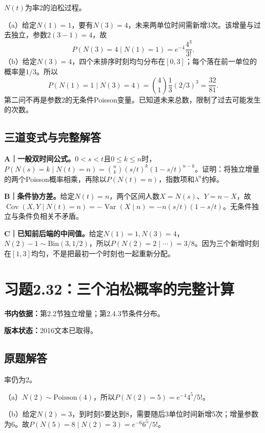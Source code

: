 \documentclass[
  11pt,
  a4paper,
  UTF8,fontset=fandol]{ctexart}
\let\OldSection\section
\renewcommand{\section}{\Needspace{7\baselineskip}\OldSection}
\let\OldSubsection\subsection
\renewcommand{\subsection}{\Needspace{5\baselineskip}\OldSubsection}
\begin{document}
\(N(t)\)为率2的泊松过程。

（a）给定\(N(1)=1\)，要有\(N(3)=4\)，未来两单位时间需新增3次。该增量与过去独立，参数\(2(3-1)=4\)，故
\[\boxed{P(N(3)=4\mid N(1)=1)=e^{-4}\frac{4^3}{3!}.}\]
（b）给定\(N(3)=4\)，四个未排序时刻均匀分布在\([0,3]\)；每个落在前一单位的概率是\(1/3\)。所以
\[\boxed{P(N(1)=1\mid N(3)=4)=\binom41\frac13(2/3)^3=\frac{32}{81}.}\]
第二问不再是参数2的无条件Poisson变量。已知道未来总数，限制了过去可能发生的次数。

\subsection{三道变式与完整解答}\label{ux4e09ux9053ux53d8ux5f0fux4e0eux5b8cux6574ux89e3ux7b54-30}

\textbf{A｜一般双时间公式。}\(0<s<t\)且\(0\le k\le n\)时，\(P(N(s)=k\mid N(t)=n)=\binom nk(s/t)^k(1-s/t)^{n-k}\)。证明：将独立增量的两个Poisson概率相乘，再除以\(P(N(t)=n)\)，指数项和\(\lambda^n\)约掉。

\textbf{B｜条件协方差。}给定\(N(t)=n\)，两个区间人数\(X=N(s)\)、\(Y=n-X\)，故\(\operatorname{Cov}(X,Y\mid N(t)=n)=-\operatorname{Var}(X\mid n)=-n(s/t)(1-s/t)\)。无条件独立与条件负相关不矛盾。

\textbf{C｜已知前后端的中间值。}给定\(N(1)=1,N(3)=4\)，\(N(2)-1\sim\mathrm{Bin}(3,1/2)\)，所以\(P(N(2)=2\mid\cdots)=3/8\)。因为三个新增时刻在\([1,3]\)均匀，不是把最初一个时刻也一起重新分配。

\newpage

\section{习题2.32：三个泊松概率的完整计算}\label{ux4e60ux98982.32ux4e09ux4e2aux6ccaux677eux6982ux7387ux7684ux5b8cux6574ux8ba1ux7b97}

\textbf{书内依据：}第2.2节独立增量；第2.4.3节条件分布。

\textbf{版本状态：}2016文本已取得。

\subsection{原题解答}\label{ux539fux9898ux89e3ux7b54-31}

率仍为2。

（a）\(N(2)\sim\mathrm{Poisson}(4)\)，所以\(\boxed{P(N(2)=5)=e^{-4}4^5/5!}\)。

（b）给定\(N(2)=3\)，到时刻5要达到8，需要随后3单位时间新增5次；增量参数为6。故\(\boxed{P(N(5)=8\mid N(2)=3)=e^{-6}6^5/5!}\)。
\end{document}
